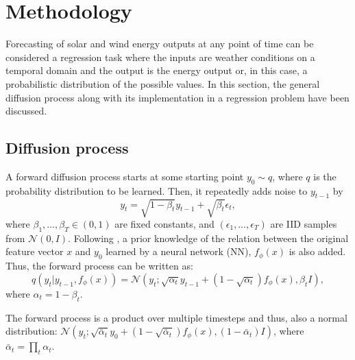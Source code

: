 \documentclass{article}
\begin{document}
\section{Methodology} \label{sec:method}

Forecasting of solar and wind energy outputs at any point of time can be considered a regression task where the inputs are weather conditions on a temporal domain and the output is the energy output or, in this case, a probabilistic distribution of the possible values. In this section, the general diffusion process along with its implementation in a regression problem have been discussed.

\subsection{Diffusion process}

A forward diffusion process \citep{sohl2015deep} starts at some starting point $y_0 \sim q$, where $q$ is the probability distribution to be learned. Then, it repeatedly adds noise to $y_{t-1}$ by 
\begin{equation} \label{eqn:diff_noise}
  y_t = \sqrt{1-\beta_t} y_{t-1} + \sqrt{\beta_t}\epsilon_t,
\end{equation}
where $\beta_1,\dots,\beta_T \in (0, 1)$ are fixed constants, and $(\epsilon_1,\dots,\epsilon_T)$ are IID samples from $\mathcal{N}(0, I)$. 
Following \citet{han2022card}, a prior knowledge of the relation between the original feature vector $x$ and $y_0$ learned by a neural network (NN), $f_\phi(x)$ is also added. 
Thus, the forward process can be written as:
\begin{equation}
  q(y_t | y_{t-1}, f_\phi(x)) = \mathcal{N}(y_t ; \sqrt{\alpha_t}y_{t-1} + (1-\sqrt{\alpha_t})f_\phi(x), \beta_tI),
\end{equation}
where $\alpha_t = 1 - \beta_t$.

The forward process is a product over multiple timesteps and thus, also a normal distribution: $\mathcal{N}(y_t; \sqrt{\bar{\alpha}_t}y_0 + (1-\sqrt{\bar{\alpha}_t})f_\phi(x), (1-\bar{\alpha}_t)I)$, where $\bar{\alpha}_t = \prod_t\alpha_t$.
\end{document}
